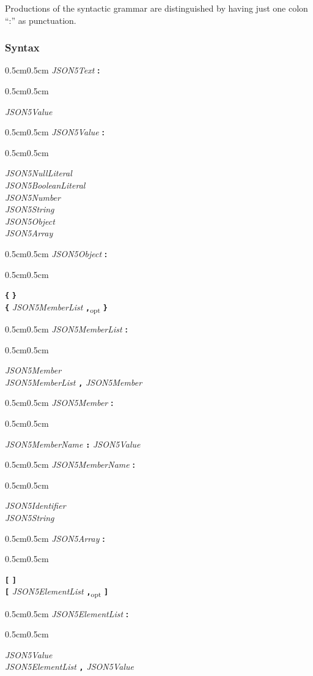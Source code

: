 \documentclass{article}
\newenvironment{gramprod}[2]{
	\begin{samepage}
	\begin{adjustwidth}{0.5cm}{0.5cm}
		\emph{#1} \textbf{#2}
		\begin{adjustwidth}{0.5cm}{0.5cm}
		}{
		\medskip
		\end{adjustwidth}
	\end{adjustwidth}
	\end{samepage}
}
\newenvironment{synprod}[1]{
	\begin{gramprod}{#1}{:}
	}{
	\end{gramprod}
}
\newcommand{\token}[1]{\emph{#1}}
\newcommand{\lit}[1]{\textbf{\texttt{#1}}}
\newcommand{\opt}[1]{#1\textsubscript{opt}}
\begin{document}
Productions of the syntactic grammar are distinguished by having just one colon ``:'' as punctuation.

\subsubsection*{Syntax}

\begin{synprod}{JSON5Text}
	\token{JSON5Value}
\end{synprod}

\begin{synprod}{JSON5Value}
	\token{JSON5NullLiteral}\\
	\token{JSON5BooleanLiteral}\\
	\token{JSON5Number}\\
	\token{JSON5String}\\
	\token{JSON5Object}\\
	\token{JSON5Array}
\end{synprod}

\begin{synprod}{JSON5Object}
	\lit{\{} \lit{\}}\\
	\lit{\{} \token{JSON5MemberList} \opt{\lit{,}} \lit{\}}
\end{synprod}

\begin{synprod}{JSON5MemberList}
	\token{JSON5Member}\\
	\token{JSON5MemberList} \lit{,} \token{JSON5Member}
\end{synprod}

\begin{synprod}{JSON5Member}
	\token{JSON5MemberName} \lit{:} \token{JSON5Value}
\end{synprod}

\begin{synprod}{JSON5MemberName}
	\token{JSON5Identifier}\\
	\token{JSON5String}
\end{synprod}

\begin{synprod}{JSON5Array}
	\lit{[} \lit{]}\\
	\lit{[} \token{JSON5ElementList} \opt{\lit{,}} \lit{]}
\end{synprod}

\begin{synprod}{JSON5ElementList}
	\token{JSON5Value}\\
	\token{JSON5ElementList} \lit{,} \token{JSON5Value}
\end{synprod}

\printbibliography
\end{document}

